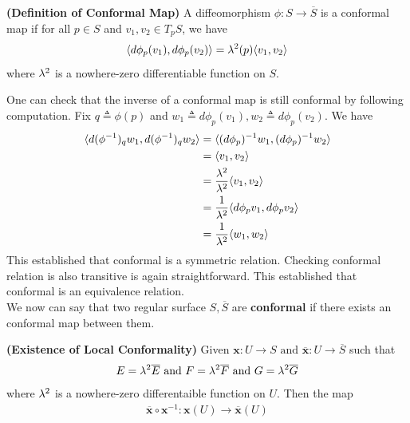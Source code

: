 \documentclass{report}
\begin{document}
\begin{definition}
\textbf{(Definition of Conformal Map)} A diffeomorphism $\phi:S\rightarrow \overline{S}$ is a conformal map if for all $p \in S$ and $v_1,v_2 \in T_pS$, we have 
\begin{align*}
\langle d\phi_p(v_1),d\phi_p(v_2)\rangle = \lambda^2 (p) \langle v_1,v_2\rangle 
\end{align*}
where $\lambda ^2 $ is a nowhere-zero differentiable function on $S$.
\end{definition}
\begin{mdframed}
One can check that the inverse of a conformal map is still conformal by following computation. Fix $q\triangleq \phi(p)$ and $w_1\triangleq d\phi_p(v_1),w_2\triangleq d\phi_p(v_2)$. We have 
\begin{align*}
\langle d(\phi^{-1})_qw_1,d(\phi^{-1})_qw_2\rangle &= \langle (d\phi_p)^{-1}w_1, (d\phi_p)^{-1}w_2\rangle \\
&=\langle v_1 , v_2\rangle \\
&=\frac{\lambda ^2}{\lambda ^2} \langle v_1,v_2\rangle \\
&=\frac{1}{\lambda ^2} \langle d\phi_pv_1 , d\phi_p v_2\rangle \\
&=\frac{1}{\lambda ^2}\langle w_1,w_2\rangle 
\end{align*}
This established that conformal is a symmetric relation. Checking conformal relation is also transitive is again straightforward. This established that conformal is an equivalence relation.\\

We now can say that two regular surface $S,\overline{S}$ are \textbf{conformal} if there exists an conformal map between them.
\end{mdframed}
\begin{theorem}
\textbf{(Existence of Local Conformality)} Given $\textbf{x}:U\rightarrow S\text{ and }\overline{\textbf{x}}:U\rightarrow \overline{S}$ such that 
\begin{align*}
E=\lambda^2 \overline{E}\text{ and }F=\lambda ^2 \overline{F}\text{ and }G=\lambda ^2 \overline{G}
\end{align*}
where $\lambda^2$ is a nowhere-zero differentaible function on $U$. Then the map 
 \begin{align*}
\overline{\textbf{x}}\circ \textbf{x}^{-1}:\textbf{x}(U)\rightarrow \overline{\textbf{x}}(U)
\end{align*}
\end{theorem}
\end{document}
